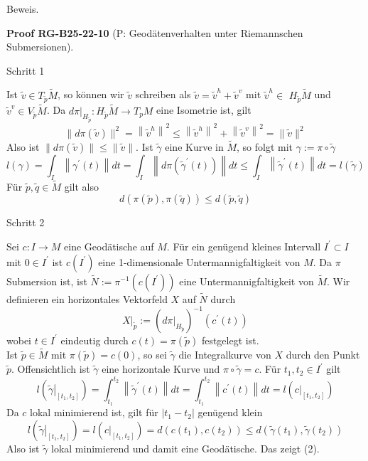 \documentclass[10pt, letterpaper]{article}
\newcommand{\CustomHeading}[3]{%
  \par\medskip\noindent%
  \textbf{#1 #2} \textnormal{(#3)}.\enskip%
}
\newenvironment{PROOF}[2]{\begin{unitbox}\CustomHeading{Proof}{#1}{#2}}{\end{unitbox}}
\begin{document}
Beweis. 

\begin{PROOF}{RG-B25-22-10}{P: Geodätenverhalten unter Riemannschen Submersionen}
Schritt 1

Ist $\tilde{v} \in T_{\tilde{p}} \tilde{M}$, so können wir $\tilde{v}$ schreiben als $\tilde{v}=\tilde{v}^{h}+\tilde{v}^{v}$ mit $\tilde{v}^{h} \in$ $H_{\tilde{p}} \tilde{M}$ und $\tilde{v}^{v} \in V_{\tilde{p}} \tilde{M}$. Da $\left.d \pi\right|_{H_{\tilde{p}}}: H_{\tilde{p}} \tilde{M} \rightarrow T_{p} M$ eine Isometrie ist, gilt
$$
\|d \pi(\tilde{v})\|^{2}=\left\|\tilde{v}^{h}\right\|^{2} \leq\left\|\tilde{v}^{h}\right\|^{2}+\left\|\tilde{v}^{v}\right\|^{2}=\|\tilde{v}\|^{2}
$$
Also ist $\|d \pi(\tilde{v})\| \leq\|\tilde{v}\|$. Ist $\tilde{\gamma}$ eine Kurve in $\tilde{M}$, so folgt mit $\gamma:=\pi \circ \tilde{\gamma}$
$$
l(\gamma)=\int_{I}\left\|\gamma^{\prime}(t)\right\| d t=\int_{I}\left\|d \pi\left(\tilde{\gamma}^{\prime}(t)\right)\right\| d t \leq \int_{I}\left\|\tilde{\gamma}^{\prime}(t)\right\| d t=l(\tilde{\gamma})
$$
Für $\tilde{p}, \tilde{q} \in \tilde{M}$ gilt also
$$
d(\pi(\tilde{p}), \pi(\tilde{q})) \leq d(\tilde{p}, \tilde{q})
$$



Schritt 2

Sei $c: I \rightarrow M$ eine Geodätische auf $M$. Für ein genügend kleines Intervall $I^{\prime} \subset I$ mit $0 \in I^{\prime}$ ist $c\left(I^{\prime}\right)$ eine 1-dimensionale Untermannigfaltigkeit von $M$. Da $\pi$ Submersion ist, ist $\tilde{N}:=\pi^{-1}\left(c\left(I^{\prime}\right)\right)$ eine Untermannigfaltigkeit von $\tilde{M}$. Wir definieren ein horizontales Vektorfeld $X$ auf $\tilde{N}$ durch
$$
\left.X\right|_{\tilde{p}}:=\left(\left.d \pi\right|_{H_{\tilde{p}}}\right)^{-1}\left(c^{\prime}(t)\right)
$$
wobei $t \in I^{\prime}$ eindeutig durch $c(t)=\pi(\tilde{p})$ festgelegt ist.\\
Ist $\tilde{p} \in \tilde{M}$ mit $\pi(\tilde{p})=c(0)$, so sei $\tilde{\gamma}$ die Integralkurve von $X$ durch den Punkt $\tilde{p}$. Offensichtlich ist $\tilde{\gamma}$ eine horizontale Kurve und $\pi \circ \tilde{\gamma}=c$. Für $t_{1}, t_{2} \in I^{\prime}$ gilt
$$
l\left(\left.\tilde{\gamma}\right|_{\left[t_{1}, t_{2}\right]}\right)=\int_{t_{1}}^{t_{2}}\left\|\tilde{\gamma}^{\prime}(t)\right\| d t=\int_{t_{1}}^{t_{2}}\left\|c^{\prime}(t)\right\| d t=l\left(\left.c\right|_{\left[t_{1}, t_{2}\right]}\right)
$$
Da $c$ lokal minimierend ist, gilt für $\left|t_{1}-t_{2}\right|$ genügend klein
$$
l\left(\left.\tilde{\gamma}\right|_{\left[t_{1}, t_{2}\right]}\right)=l\left(\left.c\right|_{\left[t_{1}, t_{2}\right]}\right)=d\left(c\left(t_{1}\right), c\left(t_{2}\right)\right) \leq d\left(\tilde{\gamma}\left(t_{1}\right), \tilde{\gamma}\left(t_{2}\right)\right)
$$
Also ist $\tilde{\gamma}$ lokal minimierend und damit eine Geodätische. Das zeigt (2).


\end{PROOF}
\end{document}
